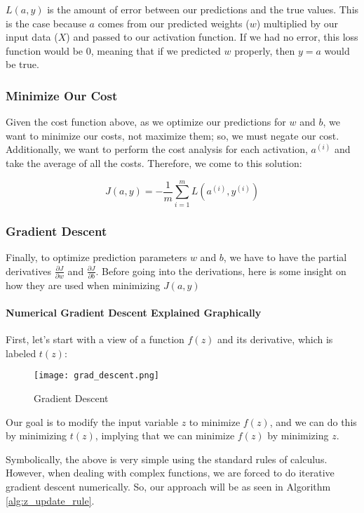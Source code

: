 \documentclass{article}
\newcommand{\myparagraph}[1]{\paragraph{#1}\mbox{}}
\begin{document}
$L(a,y)$ is the amount of error between our predictions and the true values.  This is the case because $a$ comes from our predicted weights ($w$) multiplied by our input data ($X$) and passed to our activation function.  If we had no error, this loss function would be 0, meaning that if we predicted $w$ properly, then $y = a$ would be true.

\subsubsection{Minimize Our Cost}

Given the cost function above, as we optimize our predictions for $w$ and $b$, we want to minimize our costs, not maximize them; so, we must negate our cost.  Additionally, we want to perform the cost analysis for each activation, $a^{(i)}$ and take the average of all the costs. Therefore, we come to this solution:

$$J(a,y) = -\frac{1}{m} \sum_{i=1}^{m} L(a^{(i)},y^{(i)})$$

\subsubsection{Gradient Descent}

Finally, to optimize prediction parameters $w$ and $b$, we have to have the partial derivatives $\frac{\partial{J}}{\partial{w}}$ and $\frac{\partial{J}}{\partial{b}}$.  Before going into the derivations, here is some insight on how they are used when minimizing $J(a,y)$

\myparagraph{Numerical Gradient Descent Explained Graphically}

First, let's start with a view of a function $f(z)$ and its derivative, which is labeled $t(z)$:

\begin{figure}[H]
\texttt{[image: grad\_descent.png]}
\caption{Gradient Descent}
\label{fig:grad_descent}
\end{figure}

Our goal is to modify the input variable $z$ to minimize $f(z)$, and we can do this by minimizing $t(z)$, implying that we can minimize $f(z)$ by minimizing $z$.

Symbolically, the above is very simple using the standard rules of calculus.  However, when dealing with complex functions, we are forced to do iterative gradient descent numerically.  So, our approach will be as seen in Algorithm \ref{alg:z_update_rule}.
\end{document}
